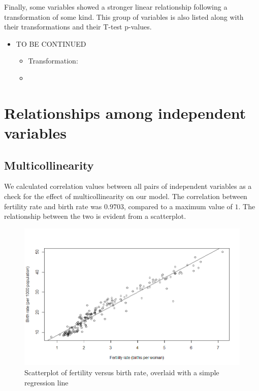 \documentclass[oneside,12pt]{report}
\begin{document}
Finally, some variables showed a stronger linear relationship following a transformation of some kind. This group of variables is also listed along with their transformations and their T-test p-values.

\begin{itemize}
\item TO BE CONTINUED
	\begin{itemize}
	\item Transformation:
	\item
	\end{itemize}
\end{itemize}


\section*{Relationships among independent variables}
\subsection*{Multicollinearity}

We calculated correlation values between all pairs of independent variables as a check for the effect of multicollinearity on our model. The correlation between fertility rate and birth rate was \begin{math}0.9703\end{math}, compared to a maximum value of \begin{math}1\end{math}. The relationship between the two is evident from a scatterplot. 

\begin{figure}
\centering
\label{fig:fertility-birth_rate}
\includegraphics[width=\textwidth]{fertility-birth_rate.png}
\caption[Scatterplot of the relationship between two independent variables]{Scatterplot of fertility versus birth rate, overlaid with a simple regression line}
\end{figure}
\end{document}
